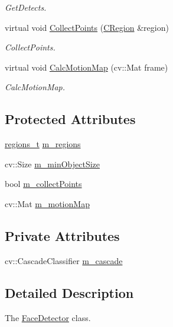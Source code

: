\begin{DoxyCompactItemize}
\begin{DoxyCompactList}\small\item\em Get\+Detects. \end{DoxyCompactList}\item 
virtual void \mbox{\hyperlink{class_base_detector_a20380b0980c6f262b0829f37fb89d2a7}{Collect\+Points}} (\mbox{\hyperlink{class_c_region}{C\+Region}} \&region)
\begin{DoxyCompactList}\small\item\em Collect\+Points. \end{DoxyCompactList}\item 
virtual void \mbox{\hyperlink{class_base_detector_a73c66f0d4dad263fcf65c09a6f6feda2}{Calc\+Motion\+Map}} (cv\+::\+Mat frame)
\begin{DoxyCompactList}\small\item\em Calc\+Motion\+Map. \end{DoxyCompactList}\end{DoxyCompactItemize}
\subsection*{Protected Attributes}
\begin{DoxyCompactItemize}
\item 
\mbox{\hyperlink{defines_8h_a01db0de56a20f4342820a093c5154536}{regions\+\_\+t}} \mbox{\hyperlink{class_base_detector_a409c20093acba261db8354ca72058fce}{m\+\_\+regions}}
\item 
cv\+::\+Size \mbox{\hyperlink{class_base_detector_a651b938c89c94daac4763728637d90c9}{m\+\_\+min\+Object\+Size}}
\item 
bool \mbox{\hyperlink{class_base_detector_a403cbf784fcb960bdb7d080c86c4a2ea}{m\+\_\+collect\+Points}}
\item 
cv\+::\+Mat \mbox{\hyperlink{class_base_detector_a45a2d54a0b69e271aa5c44ee301682b7}{m\+\_\+motion\+Map}}
\end{DoxyCompactItemize}
\subsection*{Private Attributes}
\begin{DoxyCompactItemize}
\item 
cv\+::\+Cascade\+Classifier \mbox{\hyperlink{class_face_detector_ad1d3ea259a43c8806bc658273024929a}{m\+\_\+cascade}}
\end{DoxyCompactItemize}


\subsection{Detailed Description}
The \mbox{\hyperlink{class_face_detector}{Face\+Detector}} class. 

